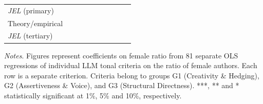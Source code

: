 \begin{table}
\begin{threeparttable}
\begin{tabular}{p{4.5cm}S@{}S@{}S@{}S@{}S@{}S@{}S@{}S@{}S@{}}
            \textit{JEL} (primary)        &               &               &               &               &               &               &           {}   &               &               \\
            Theory/empirical              &               &               &               &               &               &               &               &           {}   &               \\
            \textit{JEL} (tertiary)       &               &               &               &               &               &               &               &               &           {}   \\
            \bottomrule
        \end{tabular}
        \begin{tablenotes}
            \tiny
            \item \textit{Notes}. Figures represent coefficients on female ratio from 81 separate OLS regressions of individual LLM tonal criteria on the ratio of female authors. Each row is a separate criterion. Criteria belong to groups G1 (Creativity \& Hedging), G2 (Assertiveness \& Voice), and G3 (Structural Directness). ***, ** and * statistically significant at 1\%, 5\% and 10\%, respectively.
        \end{tablenotes}
    \end{threeparttable}

\end{table}
